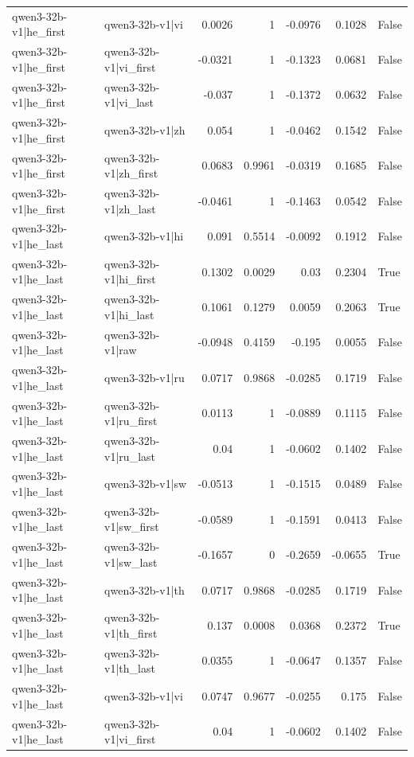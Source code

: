 \begin{table}
\begin{tabular}{l l r r r r l}
qwen3-32b-v1|he_first & qwen3-32b-v1|vi & 0.0026 & 1 & -0.0976 & 0.1028 & False \\
qwen3-32b-v1|he_first & qwen3-32b-v1|vi_first & -0.0321 & 1 & -0.1323 & 0.0681 & False \\
qwen3-32b-v1|he_first & qwen3-32b-v1|vi_last & -0.037 & 1 & -0.1372 & 0.0632 & False \\
qwen3-32b-v1|he_first & qwen3-32b-v1|zh & 0.054 & 1 & -0.0462 & 0.1542 & False \\
qwen3-32b-v1|he_first & qwen3-32b-v1|zh_first & 0.0683 & 0.9961 & -0.0319 & 0.1685 & False \\
qwen3-32b-v1|he_first & qwen3-32b-v1|zh_last & -0.0461 & 1 & -0.1463 & 0.0542 & False \\
qwen3-32b-v1|he_last & qwen3-32b-v1|hi & 0.091 & 0.5514 & -0.0092 & 0.1912 & False \\
qwen3-32b-v1|he_last & qwen3-32b-v1|hi_first & 0.1302 & 0.0029 & 0.03 & 0.2304 & True \\
qwen3-32b-v1|he_last & qwen3-32b-v1|hi_last & 0.1061 & 0.1279 & 0.0059 & 0.2063 & True \\
qwen3-32b-v1|he_last & qwen3-32b-v1|raw & -0.0948 & 0.4159 & -0.195 & 0.0055 & False \\
qwen3-32b-v1|he_last & qwen3-32b-v1|ru & 0.0717 & 0.9868 & -0.0285 & 0.1719 & False \\
qwen3-32b-v1|he_last & qwen3-32b-v1|ru_first & 0.0113 & 1 & -0.0889 & 0.1115 & False \\
qwen3-32b-v1|he_last & qwen3-32b-v1|ru_last & 0.04 & 1 & -0.0602 & 0.1402 & False \\
qwen3-32b-v1|he_last & qwen3-32b-v1|sw & -0.0513 & 1 & -0.1515 & 0.0489 & False \\
qwen3-32b-v1|he_last & qwen3-32b-v1|sw_first & -0.0589 & 1 & -0.1591 & 0.0413 & False \\
qwen3-32b-v1|he_last & qwen3-32b-v1|sw_last & -0.1657 & 0 & -0.2659 & -0.0655 & True \\
qwen3-32b-v1|he_last & qwen3-32b-v1|th & 0.0717 & 0.9868 & -0.0285 & 0.1719 & False \\
qwen3-32b-v1|he_last & qwen3-32b-v1|th_first & 0.137 & 0.0008 & 0.0368 & 0.2372 & True \\
qwen3-32b-v1|he_last & qwen3-32b-v1|th_last & 0.0355 & 1 & -0.0647 & 0.1357 & False \\
qwen3-32b-v1|he_last & qwen3-32b-v1|vi & 0.0747 & 0.9677 & -0.0255 & 0.175 & False \\
qwen3-32b-v1|he_last & qwen3-32b-v1|vi_first & 0.04 & 1 & -0.0602 & 0.1402 & False \\

\end{tabular}
\end{table}
